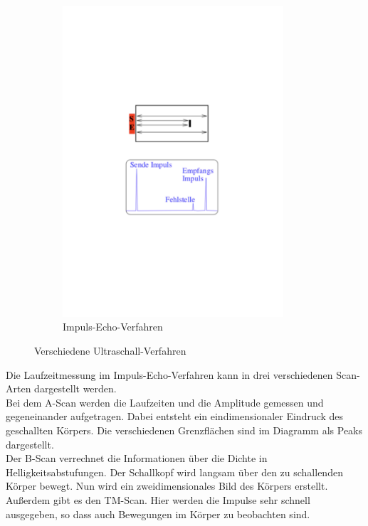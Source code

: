 \begin{figure}[h!]
\begin{subfigure}{0.49\textwidth}
  \includegraphics[width=0.9\textwidth]{impecho.pdf}
  \caption{Impuls-Echo-Verfahren \cite{1}}
  \label{fig:impecho}
 \end{subfigure}
 \caption{Verschiedene Ultraschall-Verfahren}
 \label{fig:verfahren}
\end{figure}
Die Laufzeitmessung im Impuls-Echo-Verfahren kann in drei verschiedenen Scan-Arten dargestellt werden.
\\Bei dem A-Scan werden die Laufzeiten und die Amplitude gemessen und gegeneinander aufgetragen.
Dabei entsteht ein eindimensionaler Eindruck des geschallten Körpers.
Die verschiedenen Grenzflächen sind im Diagramm als Peaks dargestellt.
\\Der B-Scan verrechnet die Informationen über die Dichte in Helligkeitsabstufungen.
Der Schallkopf wird langsam über den zu schallenden Körper bewegt.
Nun wird ein zweidimensionales Bild des Körpers erstellt.
\\Außerdem gibt es den TM-Scan.
Hier werden die Impulse sehr schnell ausgegeben, so dass auch Bewegungen im Körper zu beobachten sind.

\FloatBarrier
